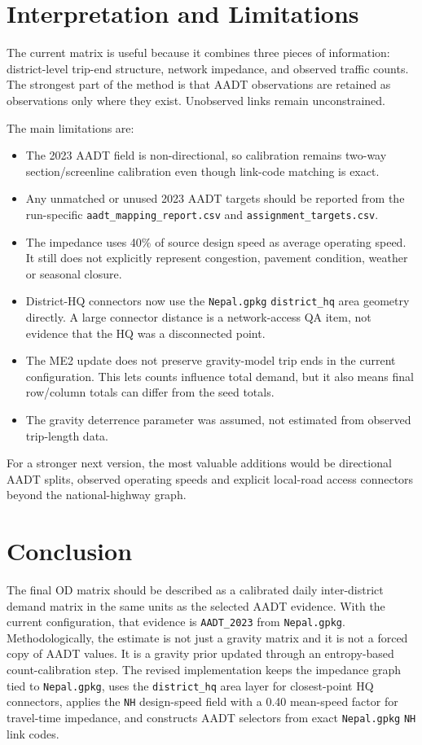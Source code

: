 \documentclass[11pt,a4paper]{article}
\begin{document}
\section{Interpretation and Limitations}

The current matrix is useful because it combines three pieces of information:
district-level trip-end structure, network impedance, and observed traffic
counts. The strongest part of the method is that AADT observations are retained
as observations only where they exist. Unobserved links remain unconstrained.

The main limitations are:

\begin{itemize}
    \item The 2023 AADT field is non-directional, so calibration remains two-way
    section/screenline calibration even though link-code matching is exact.
    \item Any unmatched or unused 2023 AADT targets should be reported from the
    run-specific \texttt{aadt\_mapping\_report.csv} and
    \texttt{assignment\_targets.csv}.
    \item The impedance uses 40\% of source design speed as average operating
    speed. It still does not explicitly represent congestion, pavement
    condition, weather or seasonal closure.
    \item District-HQ connectors now use the \texttt{Nepal.gpkg}
    \texttt{district\_hq} area geometry directly. A large connector distance is
    a network-access QA item, not evidence that the HQ was a disconnected point.
    \item The ME2 update does not preserve gravity-model trip ends in the
    current configuration. This lets counts influence total demand, but it also
    means final row/column totals can differ from the seed totals.
    \item The gravity deterrence parameter was assumed, not estimated from
    observed trip-length data.
\end{itemize}

For a stronger next version, the most valuable additions would be directional
AADT splits, observed operating speeds and explicit local-road access
connectors beyond the national-highway graph.

\section{Conclusion}

The final OD matrix should be described as a calibrated daily inter-district
demand matrix in the same units as the selected AADT evidence. With the current
configuration, that evidence is \texttt{AADT\_2023} from
\texttt{Nepal.gpkg}. Methodologically, the estimate is not just a gravity
matrix and it is not a forced copy of AADT values. It is a gravity prior
updated through an entropy-based count-calibration step. The revised
implementation keeps the impedance graph tied to \texttt{Nepal.gpkg}, uses
the \texttt{district\_hq} area layer for closest-point HQ connectors, applies
the \texttt{NH} design-speed field with a 0.40 mean-speed factor for
travel-time impedance, and constructs AADT selectors from exact
\texttt{Nepal.gpkg} \texttt{NH} link codes.
\end{document}
